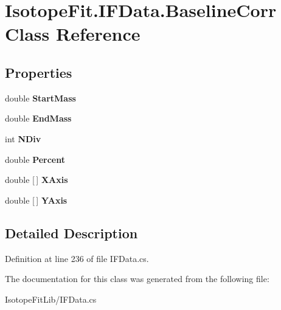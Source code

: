 \hypertarget{class_isotope_fit_1_1_i_f_data_1_1_baseline_corr}{}\section{Isotope\+Fit.\+I\+F\+Data.\+Baseline\+Corr Class Reference}
\label{class_isotope_fit_1_1_i_f_data_1_1_baseline_corr}
\subsection*{Properties}
\begin{DoxyCompactItemize}
\item 
\mbox{\label{class_isotope_fit_1_1_i_f_data_1_1_baseline_corr_a9c464d39ab74e62c887b450002256902}} 
double {\bfseries Start\+Mass}
\item 
\mbox{\label{class_isotope_fit_1_1_i_f_data_1_1_baseline_corr_a3ddf6fd1df96bc69336b4b6822ad7e4f}} 
double {\bfseries End\+Mass}
\item 
\mbox{\label{class_isotope_fit_1_1_i_f_data_1_1_baseline_corr_aff8b37286e9eeb3239af723553e27f7f}} 
int {\bfseries N\+Div}
\item 
\mbox{\label{class_isotope_fit_1_1_i_f_data_1_1_baseline_corr_a352473c9b2afa678f8595d0e1a9389fa}} 
double {\bfseries Percent}
\item 
\mbox{\label{class_isotope_fit_1_1_i_f_data_1_1_baseline_corr_a90e35ea8c62d07f0279f4b5f7d440491}} 
double \mbox{[}$\,$\mbox{]} {\bfseries X\+Axis}
\item 
\mbox{\label{class_isotope_fit_1_1_i_f_data_1_1_baseline_corr_aa71067f79827da27836daa705413133c}} 
double \mbox{[}$\,$\mbox{]} {\bfseries Y\+Axis}
\end{DoxyCompactItemize}


\subsection{Detailed Description}


Definition at line 236 of file I\+F\+Data.\+cs.



The documentation for this class was generated from the following file\+:\begin{DoxyCompactItemize}
\item 
Isotope\+Fit\+Lib/I\+F\+Data.\+cs\end{DoxyCompactItemize}
